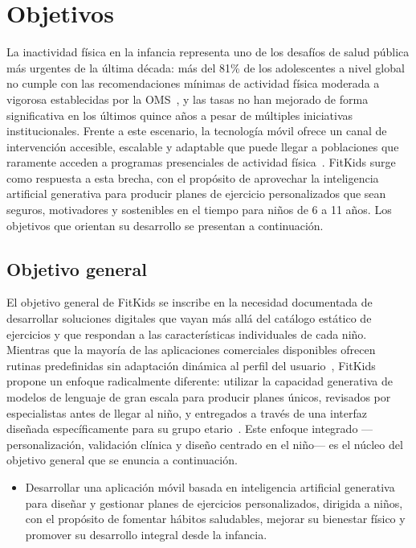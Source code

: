 		\section{Objetivos}
			\label{objectives}
			La inactividad física en la infancia representa uno de los desafíos de salud pública más urgentes de la última década: más del 81\% de los adolescentes a nivel global no cumple con las recomendaciones mínimas de actividad física moderada a vigorosa establecidas por la OMS~\cite{Guthold2020}, y las tasas no han mejorado de forma significativa en los últimos quince años a pesar de múltiples iniciativas institucionales. Frente a este escenario, la tecnología móvil ofrece un canal de intervención accesible, escalable y adaptable que puede llegar a poblaciones que raramente acceden a programas presenciales de actividad física~\cite{Direito2017}. FitKids surge como respuesta a esta brecha, con el propósito de aprovechar la inteligencia artificial generativa para producir planes de ejercicio personalizados que sean seguros, motivadores y sostenibles en el tiempo para niños de 6 a 11 años. Los objetivos que orientan su desarrollo se presentan a continuación.
			
			\subsection{Objetivo general}
			\label{objgen}
				El objetivo general de FitKids se inscribe en la necesidad documentada de desarrollar soluciones digitales que vayan más allá del catálogo estático de ejercicios y que respondan a las características individuales de cada niño. Mientras que la mayoría de las aplicaciones comerciales disponibles ofrecen rutinas predefinidas sin adaptación dinámica al perfil del usuario~\cite{Schoeppe2017}, FitKids propone un enfoque radicalmente diferente: utilizar la capacidad generativa de modelos de lenguaje de gran escala para producir planes únicos, revisados por especialistas antes de llegar al niño, y entregados a través de una interfaz diseñada específicamente para su grupo etario~\cite{Hourcade2015}. Este enfoque integrado ---personalización, validación clínica y diseño centrado en el niño--- es el núcleo del objetivo general que se enuncia a continuación.
				
				\begin{itemize}
					\item Desarrollar una aplicación móvil basada en inteligencia artificial generativa para diseñar y gestionar planes de ejercicios personalizados, dirigida a niños, con el propósito de fomentar hábitos saludables, mejorar su bienestar físico y promover su desarrollo integral desde la infancia.
				\end{itemize}
				
